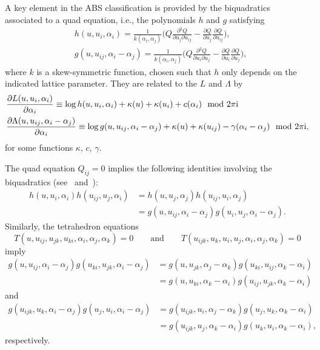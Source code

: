 \documentclass[10pt,a4paper]{amsart}
\newcommand{\pdv}[2]{\frac{\partial {#1}}{\partial {#2}}}
\numberwithin{equation}{section}
\begin{document}
A key element in the ABS classification is provided by the biquadratics associated to a quad equation, i.e., the polynomials $h$ and $g$ satisfying
 \begin{align*}
 & h(u,u_i,\alpha_i)= \frac{1}{k(\alpha_i,\alpha_j)} \biggl( Q \pdv{^2 Q}{u_j \partial u_{ij}} - \pdv{Q}{u_j}\pdv{Q}{u_{ij}} \biggr) , \\
 & g(u,u_{ij},\alpha_i-\alpha_j)= \frac{1}{k(\alpha_i,\alpha_j)} \biggl( Q \pdv{^2 Q}{u_i \partial u_j} - \pdv{Q}{u_i}\pdv{Q}{u_j} \biggr) ,
 \end{align*}
 where $k$ is a skew-symmetric function, chosen such that $h$ only depends on the indicated lattice parameter. They are related to the $L$ and $\Lambda$ by
\cite[Lemma 3]{bobenko2010lagrangian}{\samepage
 \begin{align}
	 &\pdv{L(u,u_i,\alpha_i)}{\alpha_i}\equiv \log h(u,u_i,\alpha_i) + \kappa(u) + \kappa(u_i) + c(\alpha_i) \mod 2 \pi {\rm i} \label{L-log(h)}\\
	 &\pdv{\Lambda(u,u_{ij},\alpha_i-\alpha_j)}{\alpha_i}\equiv \log g(u,u_{ij},\alpha_i-\alpha_j) + \kappa(u) + \kappa(u_{ij}) - \gamma(\alpha_i-\alpha_j) \mod 2 \pi {\rm i} , \label{Lambda-log(g)}
 \end{align}
 for some functions $\kappa$, $c$, $\gamma$.}

The quad equation $Q_{ij} = 0$ implies the following identities involving the biquadratics (see~\cite[Lemma 1]{bobenko2010lagrangian} and~\cite[Proposition 15]{adler2003classification}):
\begin{align}
	h(u,u_i,\alpha_i)h(u_{ij},u_j,\alpha_i)
 &= h(u,u_j,\alpha_j)h(u_{ij},u_i,\alpha_j) \nonumber \\
 &= g(u,u_{ij},\alpha_i-\alpha_j)g(u_i,u_j,\alpha_i-\alpha_j) .\label{biquadratric-quad}
\end{align}
Similarly, the tetrahedron equations
\[ T(u,u_{ij},u_{jk},u_{ki},\alpha_i,\alpha_j,\alpha_k)=0 \qquad \text{and} \qquad T(u_{ijk},u_{k},u_{i},u_{j},\alpha_i,\alpha_j,\alpha_k)=0\]
imply
\begin{align}
	g(u,u_{ij},\alpha_i-\alpha_j)g(u_{ki},u_{jk},\alpha_i-\alpha_j) & = g(u,u_{jk},\alpha_j-\alpha_k)g(u_{ki},u_{ij},\alpha_k-\alpha_i) \nonumber \\
	& = g(u,u_{ki},\alpha_k-\alpha_i)g(u_{ij},u_{jk},\alpha_k-\alpha_i)\label{biquadratric-tetra}
\end{align}
and
\begin{align}
	g(u_{ijk},u_{k},\alpha_i-\alpha_j)g(u_{j},u_{i},\alpha_i-\alpha_j) & = g(u_{ijk},u_{i},\alpha_j-\alpha_k)g(u_{j},u_{k},\alpha_k-\alpha_i) \nonumber \\
	& = g(u_{ijk},u_{j},\alpha_k-\alpha_i)g(u_{k},u_{i},\alpha_k-\alpha_i),\label{biquadratric-tetra-inverted}
\end{align}
respectively.
\end{document}
